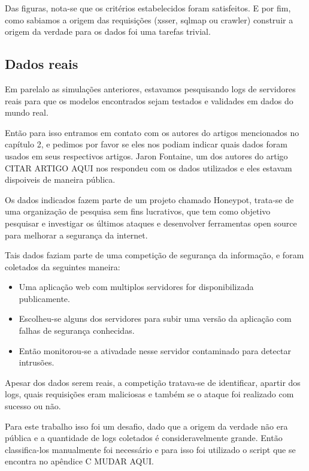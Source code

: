 Das figuras, nota-se que os critérios estabelecidos foram satisfeitos. E por fim, 
como sabiamos a origem das requisições (xsser, sqlmap ou crawler) construir a origem 
da verdade para os dados foi uma tarefas trivial.

\subsection{Dados reais}

Em parelalo as simulações anteriores, estavamos pesquisando logs de servidores reais para que os modelos 
encontrados sejam testados e validades em dados do mundo real. 

Então para isso entramos em contato com os autores do artigos mencionados no capítulo 2, e 
pedimos por favor se eles nos podiam indicar quais dados foram usados em seus respectivos artigos. Jaron Fontaine, um dos autores
do artigo CITAR ARTIGO AQUI nos respondeu com os dados utilizados e eles estavam dispoiveis de
maneira pública. 

Os dados indicados fazem parte de um projeto chamado Honeypot, trata-se de uma organização de pesquisa 
sem fins lucrativos, que tem como objetivo pesquisar e investigar os últimos ataques e desenvolver
ferramentas open source para melhorar a segurança da internet.

Tais dados faziam parte de uma competição de segurança da informação, e foram coletados da seguintes maneira:

\begin{itemize}
    \item Uma aplicação web com multiplos servidores for disponibilizada publicamente.
    \item Escolheu-se alguns dos servidores para subir uma versão da aplicação 
    com falhas de segurança conhecidas.
    \item Então monitorou-se a ativadade nesse servidor contaminado para detectar intrusões.
\end{itemize}

Apesar dos dados serem reais, a competição tratava-se de identificar, apartir dos logs, quais requisições 
eram maliciosas e também se o ataque foi realizado com sucesso ou não. 

Para este trabalho isso foi um desafio, dado que a origem da verdade não era pública e a quantidade de logs 
coletados é consideravelmente grande. Então classifica-los manualmente foi necessário e para 
isso foi utilizado o script que se encontra no apêndice C MUDAR AQUI.

